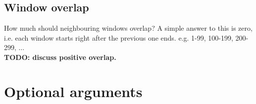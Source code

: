 \subsection{Window overlap}
How much should neighbouring windows overlap?
A simple answer to this is zero, i.e. each window starts right after the previous one ends.
e.g. 1-99, 100-199, 200-299, $\ldots$\\
{\bf TODO: discuss positive overlap.}

\section{Optional arguments}





